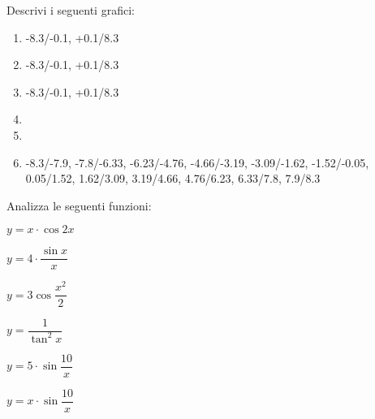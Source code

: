 \bigskip

\begin{esercizio}\label{ese:stufun.7g}
Descrivi i seguenti grafici:
\begin{multicols}{2}
 \begin{enumerate} [left=0pt, label=\alph*)]
  \item \myp 
{}
{-8.3/-0.1, +0.1/8.3} %
  \item \myp 
{} 
{-8.3/-0.1, +0.1/8.3} %
  \item \myp 
{} 
{-8.3/-0.1, +0.1/8.3} %
\vspace{1mm}
  \item \myp 
{} %
  \item \myp 
{} %
  \item \myp 
{}
{-8.3/-7.9, -7.8/-6.33, -6.23/-4.76, -4.66/-3.19, -3.09/-1.62, -1.52/-0.05, 
 0.05/1.52, 1.62/3.09, 3.19/4.66, 4.76/6.23, 6.33/7.8, 7.9/8.3} %
 \end{enumerate}
\end{multicols}
\end{esercizio}

\begin{esercizio}\label{ese:stufun.7e}
Analizza le seguenti funzioni:
\begin{multicols}{3}
 \begin{enumeratea}
  \item \(y = x \cdot \cos 2x\) \\ [.5em] %
  \item \(y = 4 \cdot \dfrac{\sin x}{x}\) %
  \item \(y = 3 \cos {\dfrac{x^2}{2}}\) \\ %
  \item \(y = \dfrac{1}{\tan^2 x}\) %
  \item \(y = 5 \cdot \sin \dfrac{10}{x}\) %
  \item \(y = x \cdot \sin \dfrac{10}{x}\) %
 \end{enumeratea}
\end{multicols}
\end{esercizio}

\bigskip

\begin{comment}
 
\begin{esercizio}
\label{ese:}
\end{esercizio}

\end{comment}
